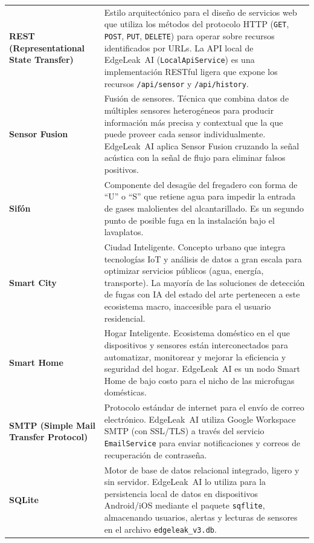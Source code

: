 \documentclass[12pt,a4paper]{article}
\begin{document}
\begin{longtable}{>{\bfseries}p{3.8cm} p{10.5cm}}
REST (Representational State Transfer) & Estilo arquitectónico para el diseño de servicios
web que utiliza los métodos del protocolo HTTP (\texttt{GET}, \texttt{POST},
\texttt{PUT}, \texttt{DELETE}) para operar sobre recursos identificados por URLs.
La API local de EdgeLeak~AI (\texttt{LocalApiService}) es una implementación RESTful
ligera que expone los recursos \texttt{/api/sensor} y \texttt{/api/history}.
\\[0.5em]

Sensor Fusion & Fusión de sensores. Técnica que combina datos de múltiples sensores
heterogéneos para producir información más precisa y contextual que la que puede proveer
cada sensor individualmente. EdgeLeak~AI aplica Sensor Fusion cruzando la señal acústica
con la señal de flujo para eliminar falsos positivos.
\\[0.5em]

Sifón & Componente del desagüe del fregadero con forma de ``U'' o ``S'' que retiene agua
para impedir la entrada de gases malolientes del alcantarillado. Es un segundo punto de
posible fuga en la instalación bajo el lavaplatos.
\\[0.5em]

Smart City & Ciudad Inteligente. Concepto urbano que integra tecnologías IoT y análisis
de datos a gran escala para optimizar servicios públicos (agua, energía, transporte).
La mayoría de las soluciones de detección de fugas con IA del estado del arte pertenecen
a este ecosistema macro, inaccesible para el usuario residencial.
\\[0.5em]

Smart Home & Hogar Inteligente. Ecosistema doméstico en el que dispositivos y sensores
están interconectados para automatizar, monitorear y mejorar la eficiencia y seguridad
del hogar. EdgeLeak~AI es un nodo Smart Home de bajo costo para el nicho de las
microfugas domésticas.
\\[0.5em]

SMTP (Simple Mail Transfer Protocol) & Protocolo estándar de internet para el envío de
correo electrónico. EdgeLeak~AI utiliza Google Workspace SMTP (con SSL/TLS) a través del
servicio \texttt{EmailService} para enviar notificaciones y correos de recuperación de
contraseña.
\\[0.5em]

SQLite & Motor de base de datos relacional integrado, ligero y sin servidor. EdgeLeak~AI
lo utiliza para la persistencia local de datos en dispositivos Android/iOS mediante el
paquete \texttt{sqflite}, almacenando usuarios, alertas y lecturas de sensores en el
archivo \texttt{edgeleak\_v3.db}.
\\[0.5em]


\end{longtable}
\end{document}
